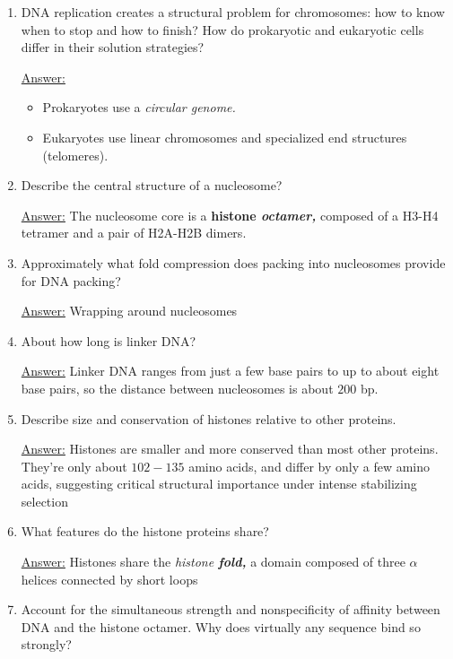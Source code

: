 \documentclass{article}
\newenvironment{QandA}{\begin{enumerate}[label=\bfseries Q\arabic*.]}
                       {\end{enumerate}}
\newenvironment{answered}{\par\normalfont\underline{Answer:}}{}
\begin{document}
\begin{QandA}
\begin{answered}
    \end{answered}
  \item{DNA replication creates a structural problem for chromosomes: how to know when to stop and how to finish? How do prokaryotic and eukaryotic cells differ in their solution strategies?}
    \begin{answered}
    \begin{itemize}
      \item{Prokaryotes use a \textit{circular genome.}}
      \item{Eukaryotes use linear chromosomes and specialized end structures (telomeres).}
    \end{itemize}
    \end{answered}
  \item{Describe the central structure of a nucleosome?}
    \begin{answered}
    The nucleosome core is a \textbf{histone \textit{octamer,}} composed of a H3-H4 tetramer and a pair of H2A-H2B dimers.
    \end{answered}
  \item{Approximately what fold compression does packing into nucleosomes provide for DNA packing?}
    \begin{answered}
    Wrapping around nucleosomes 
    \end{answered}
  \item{About how long is linker DNA?}
    \begin{answered}
    Linker DNA ranges from just a few base pairs to up to about eight base pairs, so the distance between nucleosomes is about $200$ bp.
    \end{answered}
  \item{Describe size and conservation of histones relative to other proteins.}
    \begin{answered}
    Histones are smaller and more conserved than most other proteins. They're only about $102-135$ amino acids, and differ by only a few amino acids, suggesting critical structural importance under intense stabilizing selection
    \end{answered}
  \item{What features do the histone proteins share?}
    \begin{answered}
    Histones share the \textit{histone \textbf{fold,}} a domain composed of three $\alpha$ helices connected by short loops
    \end{answered}
  \item{Account for the simultaneous strength and nonspecificity of affinity between DNA and the histone octamer. Why does virtually any sequence bind so strongly?}

\end{QandA}
\end{document}
